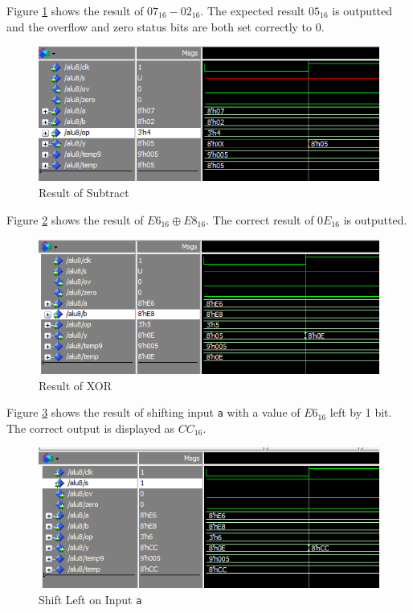 \documentclass[12pt]{article}
\begin{document}
Figure \ref{fig:subtract} shows the result of $07_{16} - 02_{16}$. The expected result $05_{16}$ is outputted and the overflow and zero status bits are both set correctly to 0.

\begin{figure}[H]
\centering
\includegraphics[width=1\linewidth]{subtract}
\caption{Result of Subtract}
\label{fig:subtract}
\end{figure}

Figure \ref{fig:XOR} shows the result of $E6_{16} \oplus E8_{16}$. The correct result of $0E_{16}$ is outputted.

\begin{figure}[H]
\centering
\includegraphics[width=1\linewidth]{XOR}
\caption{Result of XOR}
\label{fig:XOR}
\end{figure}

Figure \ref{fig:sll-a} shows the result of shifting input \texttt{a} with a value of $E6_{16}$ left by 1 bit. The correct output is displayed as $CC_{16}$.
\begin{figure}[H]
\centering
\includegraphics[width=1\linewidth]{sll-a}
\caption{Shift Left on Input \texttt{a}}
\label{fig:sll-a}
\end{figure}
\end{document}

